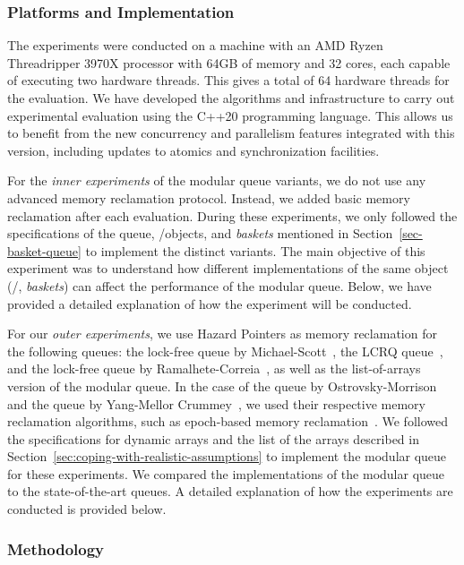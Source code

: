 \subsubsection{Platforms and Implementation}

The experiments were conducted on a machine with an AMD Ryzen Threadripper 3970X processor with 64GB of memory and 32 cores, each capable of executing two hardware threads. This gives a total of 64 hardware threads for the evaluation.  We have developed the algorithms and infrastructure to carry out experimental evaluation using the C++20 programming language. This allows us to benefit from the new concurrency and parallelism features integrated with this version, including updates to atomics and synchronization facilities.

For the \textit{inner experiments} of the modular queue variants, we do not use any advanced memory reclamation protocol. Instead, we added basic memory reclamation after each evaluation. During these experiments, we only followed the specifications of the queue, \LL/\IC objects, and \textit{baskets} mentioned in Section~\ref{sec-basket-queue} to implement the distinct variants. The main objective of this experiment was to understand how different implementations of the same object (\LL/\IC, \textit{baskets}) can affect the performance of the modular queue. Below, we have provided a detailed explanation of how the experiment will be conducted.

For our \textit{outer experiments}, we use Hazard Pointers as memory reclamation for the following queues: the lock-free queue by Michael-Scott~\cite{DBLP_conf_podc_MichaelS96}, the LCRQ queue~\cite{ppopp2013x86queues}, and the lock-free queue by Ramalhete-Correia~\cite{Ramalhete_Correia_MPMC_2016}, as well as the list-of-arrays version of the modular queue. In the case of the queue by Ostrovsky-Morrison~\cite{scalingconcurrent2020} and the queue by Yang-Mellor Crummey~\cite{DBLP_conf_ppopp_YangM16}, we used their respective memory reclamation algorithms, such as epoch-based memory reclamation~\cite{DBLP_phd_ethos_Fraser04,mckenney2001read}. We followed the specifications for dynamic arrays and the list of the arrays described in Section~\ref{sec:coping-with-realistic-assumptions} to implement the modular queue for these experiments. We compared the implementations of the modular queue to the state-of-the-art queues. A detailed explanation of how the experiments are conducted is provided below.

\subsubsection{\label{subsubsec:queues-experiment-methodology}Methodology}

